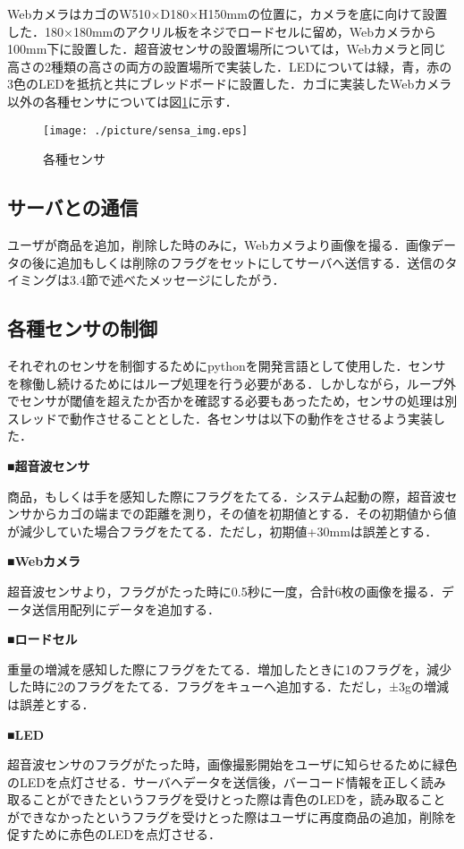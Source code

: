WebカメラはカゴのW510×D180×H150mmの位置に，カメラを底に向けて設置した．180×180mmのアクリル板をネジでロードセルに留め，Webカメラから100mm下に設置した．超音波センサの設置場所については，Webカメラと同じ高さの2種類の高さの両方の設置場所で実装した．LEDについては緑，青，赤の3色のLEDを抵抗と共にブレッドボードに設置した．カゴに実装したWebカメラ以外の各種センサについては図\ref{sensa}に示す．

\begin{figure}[htbp]
\centering
\texttt{[image: ./picture/sensa\_img.eps]}
\caption{各種センサ}
\label{sensa}
\end{figure}


\subsection*{サーバとの通信}

ユーザが商品を追加，削除した時のみに，Webカメラより画像を撮る．画像データの後に追加もしくは削除のフラグをセットにしてサーバへ送信する．送信のタイミングは3.4節で述べたメッセージにしたがう．

\subsection*{各種センサの制御}

それぞれのセンサを制御するためにpythonを開発言語として使用した．センサを稼働し続けるためにはループ処理を行う必要がある．しかしながら，ループ外でセンサが閾値を超えたか否かを確認する必要もあったため，センサの処理は別スレッドで動作させることとした．各センサは以下の動作をさせるよう実装した．

\noindent
{\bf ■超音波センサ}

商品，もしくは手を感知した際にフラグをたてる．システム起動の際，超音波センサからカゴの端までの距離を測り，その値を初期値とする．その初期値から値が減少していた場合フラグをたてる．ただし，初期値+30mmは誤差とする．

\noindent
{\bf ■Webカメラ}

超音波センサより，フラグがたった時に0.5秒に一度，合計6枚の画像を撮る．データ送信用配列にデータを追加する．

\noindent
{\bf ■ロードセル}

重量の増減を感知した際にフラグをたてる．増加したときに1のフラグを，減少した時に2のフラグをたてる．フラグをキューへ追加する．ただし，±3gの増減は誤差とする．

\noindent
{\bf ■LED}

超音波センサのフラグがたった時，画像撮影開始をユーザに知らせるために緑色のLEDを点灯させる．サーバへデータを送信後，バーコード情報を正しく読み取ることができたというフラグを受けとった際は青色のLEDを，読み取ることができなかったというフラグを受けとった際はユーザに再度商品の追加，削除を促すために赤色のLEDを点灯させる．

\newpage


